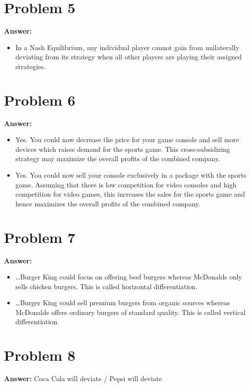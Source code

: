 \documentclass[11pt]{article}
\begin{document}
\section*{Problem 5}
\label{sec:org5a5a59e}

\textbf{Answer:}
\begin{itemize}
\item In a Nash Equilibrium, any individual player cannot gain from
unilaterally deviating from its strategy when all other players are
playing their assigned strategies.
\end{itemize}
\section*{Problem 6}
\label{sec:orgf2ff5ad}

\textbf{Answer:}
\begin{itemize}
\item Yes. You could now decrease the price for your game console and sell more
devices which raises demand for the sports game. This cross-subsidizing
strategy may maximize the overall profits of the combined company.
\item Yes. You could now sell your console exclusively in a package with the
sports game. Assuming that there is low competition for video consoles
and high competition for video games, this increases the sales for the
sports game and hence maximizes the overall profits of the combined
company.
\end{itemize}
\section*{Problem 7}
\label{sec:org73c4201}

\textbf{Answer:}
\begin{itemize}
\item \ldots{}Burger King could focus on offering beef burgers whereas McDonalds
only sells chicken burgers. This is called horizontal differentiation.
\item \ldots{}Burger King could sell premium burgers from organic sources whereas
McDonalds offers ordinary burgers of standard quality. This is called
vertical differentiation.
\end{itemize}
\section*{Problem 8}
\label{sec:org6690007}

\textbf{Answer:} Coca Cola will deviate / Pepsi will deviate\\
\end{document}
